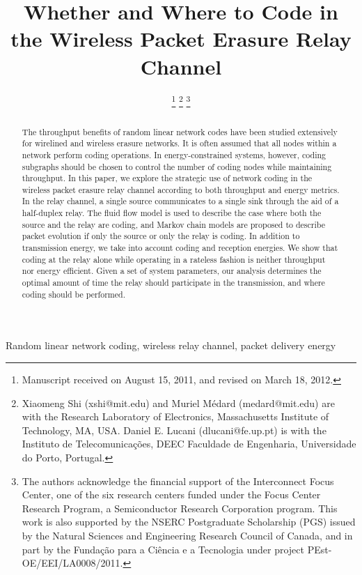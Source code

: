 \documentclass[journal, letterpaper]{IEEEtran}
\begin{document}
\title{Whether and Where to Code in the Wireless Packet Erasure Relay Channel}
\author{
\thanks{Manuscript received on August 15, 2011, and revised on March 18, 2012.}
\thanks{Xiaomeng Shi (xshi@mit.edu) and Muriel M\'{e}dard (medard@mit.edu) are with the Research Laboratory of Electronics, Massachusetts Institute of Technology, MA, USA. Daniel E. Lucani (dlucani@fe.up.pt) is with the Instituto de Telecomunica\c c\~oes, DEEC Faculdade de Engenharia, Universidade do Porto, Portugal.}
\thanks{The authors acknowledge the financial support of the Interconnect Focus Center, one of the six research centers funded under the Focus Center Research Program, a Semiconductor Research Corporation program. This work is also supported by the NSERC Postgraduate Scholarship (PGS) issued by the Natural Sciences and Engineering Research Council of Canada, and in part by the Funda\c c\~ ao para a Ci\^ encia e a Tecnologia under project PEst-OE/EEI/LA0008/2011.}
}

\maketitle
\begin{abstract}
The throughput benefits of random linear network codes have been studied extensively for wirelined and wireless erasure networks. It is often assumed that all nodes within a network perform coding operations. In energy-constrained systems, however, coding subgraphs should be chosen to control the number of coding nodes while maintaining throughput. In this paper, we explore the strategic use of network coding in the wireless packet erasure relay channel according to both throughput and energy metrics. In the relay channel, a single source communicates to a single sink through the aid of a half-duplex relay. The fluid flow model is used to describe the case where both the source and the relay are coding, and Markov chain models are proposed to describe packet evolution if only the source or only the relay is coding. In addition to transmission energy, we take into account coding and reception energies. We show that coding at the relay alone while operating in a rateless fashion is neither throughput nor energy efficient. Given a set of system parameters, our analysis determines the optimal amount of time the relay should participate in the transmission, and where coding should be performed.
\end{abstract}
\begin{IEEEkeywords}
Random linear network coding, wireless relay channel, packet delivery energy
\end{IEEEkeywords}
\end{document}
